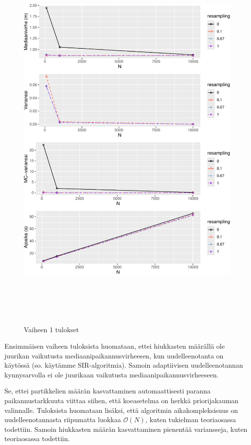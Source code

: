 \documentclass[
  12pt,
  a4paper, twoside]{book}
\begin{document}
\begin{figure}

{\centering \includegraphics[width=15cm,height=20cm]{output/figures/phase1-results-1} 

}

\caption{Vaiheen 1 tulokset}\label{fig:phase1-results}
\end{figure}

Ensimmäisen vaiheen tuloksista huomataan, ettei hiukkasten määrällä ole juurikan vaikutusta mediaanipaikannusvirheesen, kun uudelleenotanta on käytössä (so. käytämme SIR-algoritmia). Samoin adaptiivisen uudelleenotannan kynnysarvolla ei ole juurikaan vaikutusta mediaanipaikannusvirheeseen.

Se, ettei partikkelien määrän kasvattaminen automaattisesti paranna paikannustarkkuuta viittaa siihen, että koeasetelma on herkkä priorijakauman valinnalle. Tuloksista huomataan lisäksi, että algoritmin aikakompleksisuus on uudelleenotannasta riipumatta luokkaa \(\mathcal{O}(N)\), kuten tukielman teoriaosassa todettiin. Samoin hiukkasten määrän kasvattaminen pienentää variansseja, kuten teoriaosassa todettiin.
\end{document}
